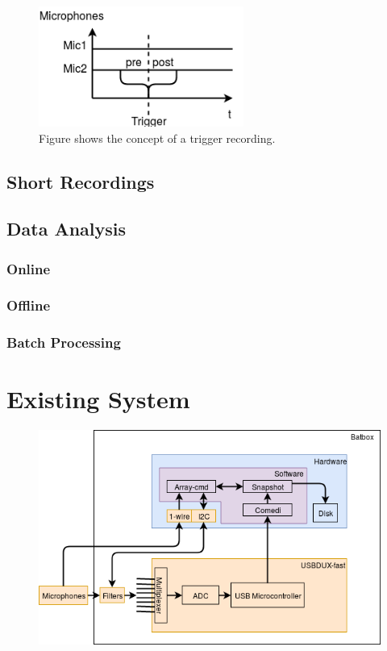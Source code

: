 \begin{figure}[h!]
	\centering
	\includegraphics[width=0.6\textwidth]{figures/recording_trigger.png}
	\caption{Figure shows the concept of a trigger recording.}\label{fig:usecase:triggerrecording}
\end{figure}
\subsection{Short Recordings}

\subsection{Data Analysis}
\subsubsection{Online}
\subsubsection{Offline}
\subsubsection{Batch Processing}

\section{Existing System}

\begin{figure}[h!]
	\includegraphics[width=1\textwidth]{figures/existing-system-overview.png} 
\end{figure}


